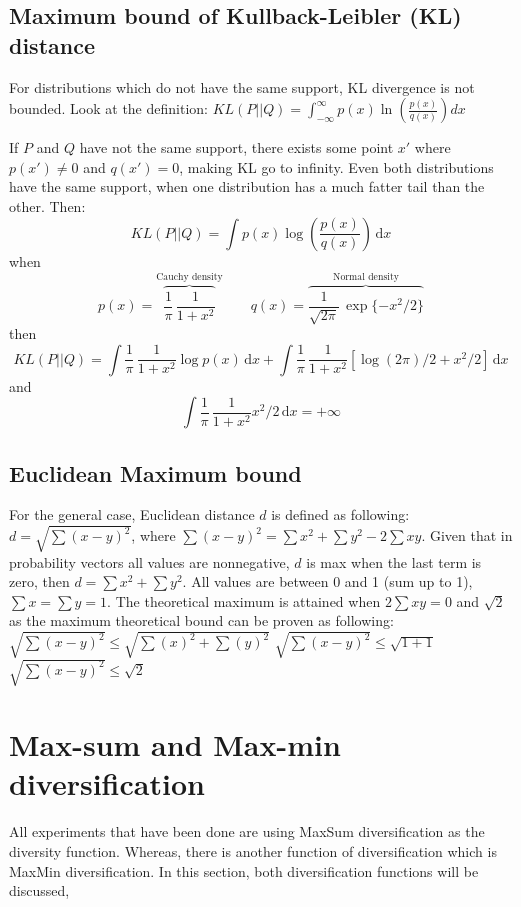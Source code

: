 \documentclass{article}
\begin{document}



\subsection{Maximum bound of Kullback-Leibler (KL) distance}

For distributions which do not have the same support, KL divergence is not bounded. Look at the definition: $KL(P\vert\vert Q) = \int_{-\infty}^{\infty} p(x)\ln\left(\frac{p(x)}{q(x)}\right) dx$

If $ P $ and $ Q $ have not the same support, there exists some point $x'$ where $p(x') \neq 0$ and $q(x') = 0$, making KL go to infinity. Even both distributions have the same support, when one distribution has a much fatter tail than the other. Then:
$$KL(P\vert\vert Q) = \int p(x)\log\left(\frac{p(x)}{q(x)}\right) \,\text{d}x$$
when
$$p(x)=\overbrace{\frac{1}{\pi}\,\frac{1}{1+x^2}}^\text{Cauchy density}\qquad q(x)=\overbrace{\frac{1}{\sqrt{2\pi}}\,\exp\{-x^2/2\}}^\text{Normal density}$$
then
$$KL(P\vert\vert Q) = \int \frac{1}{\pi}\,\frac{1}{1+x^2} \log p(x) \,\text{d}x + \int \frac{1}{\pi}\,\frac{1}{1+x^2} [\log(2\pi)/2+x^2/2]\,\text{d}x$$
and
$$\int \frac{1}{\pi}\,\frac{1}{1+x^2} x^2/2\,\text{d}x=+\infty$$


\subsection{Euclidean Maximum bound}
For the general case, Euclidean distance $d$ is defined as following: 
$d = \sqrt{\sum{(x-y)^2}}$, where $ \sum{(x-y)^2} = \sum x^2 + \sum y^2 - 2\sum xy$. Given that in probability vectors all values are nonnegative, $d$ is max when the last term is zero, then $d = \sum x^2 + \sum y^2$. All values are between 0 and 1 (sum up to 1), $\sum x = \sum y = 1$. The theoretical maximum is attained when $2\sum xy = 0$ and $\sqrt{2}$ as the maximum theoretical bound can be proven as following: 
\newline
$ \sqrt{\sum{(x-y)^2}} \leq \sqrt{\sum{(x)^2} + \sum{(y)^2}} $
\newline
$ \sqrt{\sum{(x-y)^2}} \leq \sqrt{1 + 1} $
\newline
$ \sqrt{\sum{(x-y)^2}} \leq \sqrt{2} $


\section{Max-sum and Max-min diversification}
All experiments that have been done are using MaxSum diversification as the diversity function. Whereas, there is another function of diversification which is MaxMin diversification. In this section, both diversification functions will be discussed, 
\end{document}

